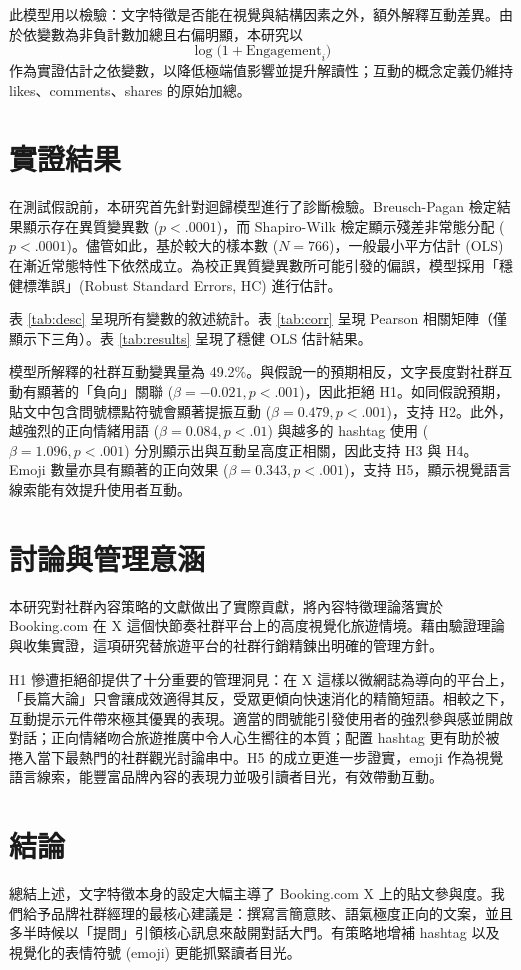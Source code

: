\documentclass[12pt,a4paper,fontset=none]{ctexart}
\begin{document}
此模型用以檢驗：文字特徵是否能在視覺與結構因素之外，額外解釋互動差異。由於依變數為非負計數加總且右偏明顯，本研究以
\[
\log\bigl(1 + \text{Engagement}_i\bigr)
\]
作為實證估計之依變數，以降低極端值影響並提升解讀性；互動的概念定義仍維持 likes、comments、shares 的原始加總。

\section{實證結果}
在測試假說前，本研究首先針對迴歸模型進行了診斷檢驗。Breusch-Pagan 檢定結果顯示存在異質變異數 ($p < .0001$)，而 Shapiro-Wilk 檢定顯示殘差非常態分配 ($p < .0001$)。儘管如此，基於較大的樣本數 ($N = 766$)，一般最小平方估計 (OLS) 在漸近常態特性下依然成立。為校正異質變異數所可能引發的偏誤，模型採用「穩健標準誤」(Robust Standard Errors, HC) 進行估計。

表 \ref{tab:desc} 呈現所有變數的敘述統計。表 \ref{tab:corr} 呈現 Pearson 相關矩陣（僅顯示下三角）。表 \ref{tab:results} 呈現了穩健 OLS 估計結果。

模型所解釋的社群互動變異量為 49.2\%。與假說一的預期相反，文字長度對社群互動有顯著的「負向」關聯 ($\beta = -0.021, p < .001$)，因此拒絕 H1。如同假說預期，貼文中包含問號標點符號會顯著提振互動 ($\beta = 0.479, p < .001$)，支持 H2。此外，越強烈的正向情緒用語 ($\beta = 0.084, p < .01$) 與越多的 hashtag 使用 ($\beta = 1.096, p < .001$) 分別顯示出與互動呈高度正相關，因此支持 H3 與 H4。Emoji 數量亦具有顯著的正向效果 ($\beta = 0.343, p < .001$)，支持 H5，顯示視覺語言線索能有效提升使用者互動。

\section{討論與管理意涵}
本研究對社群內容策略的文獻做出了實際貢獻，將內容特徵理論落實於 Booking.com 在 X 這個快節奏社群平台上的高度視覺化旅遊情境。藉由驗證理論與收集實證，這項研究替旅遊平台的社群行銷精鍊出明確的管理方針。

H1 慘遭拒絕卻提供了十分重要的管理洞見：在 X 這樣以微網誌為導向的平台上，「長篇大論」只會讓成效適得其反，受眾更傾向快速消化的精簡短語。相較之下，互動提示元件帶來極其優異的表現。適當的問號能引發使用者的強烈參與感並開啟對話；正向情緒吻合旅遊推廣中令人心生嚮往的本質；配置 hashtag 更有助於被捲入當下最熱門的社群觀光討論串中。H5 的成立更進一步證實，emoji 作為視覺語言線索，能豐富品牌內容的表現力並吸引讀者目光，有效帶動互動。

\section{結論}
總結上述，文字特徵本身的設定大幅主導了 Booking.com X 上的貼文參與度。我們給予品牌社群經理的最核心建議是：撰寫言簡意賅、語氣極度正向的文案，並且多半時候以「提問」引領核心訊息來敲開對話大門。有策略地增補 hashtag 以及視覺化的表情符號 (emoji) 更能抓緊讀者目光。
\end{document}
